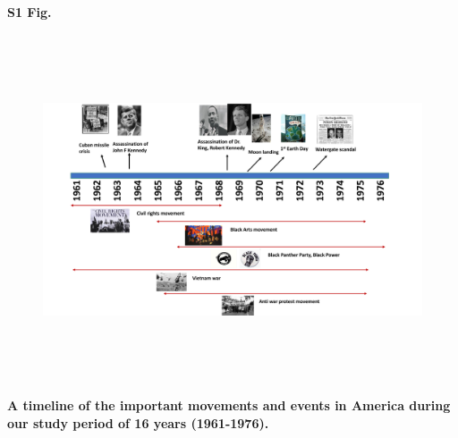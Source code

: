 \documentclass[10pt,letterpaper]{article}
\begin{document}
\paragraph*{S1 Fig.}

\begin{figure}[ht]
\centering
\includegraphics[height=4in, width=6in]{SuppFig1.pdf}
\end{figure}
\label{figS1}
{\bf A timeline of the important movements and events in America during our study period of 16 years (1961-1976).}
\end{document}

